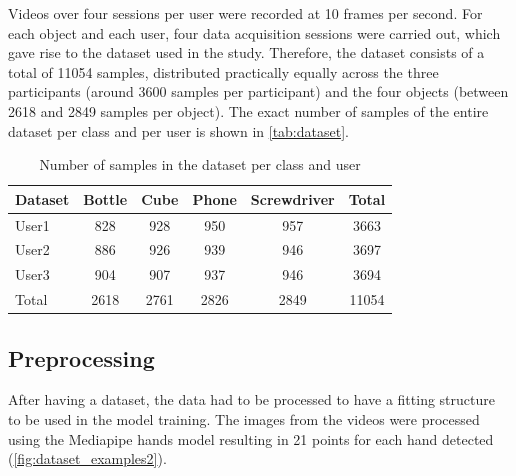 Videos over four sessions per user were recorded at 10 frames per second. For each object and each user, four data acquisition sessions were carried out, which gave rise to the dataset used in the study. Therefore, the dataset consists of a total of \num{11054} samples, distributed practically equally across the three participants (around \num{3600} samples per participant) and the four objects (between \num{2618} and \num{2849} samples per object). The exact number of samples of the entire dataset per class and per user is shown in \autoref{tab:dataset}.

\begin{table}[ht] 
\centering
\caption{Number of samples in the dataset per class and user}
\label{tab:dataset}
\begin{tabular}{lccccc}
\toprule
Dataset & Bottle & Cube & Phone & Screwdriver & Total \\
\midrule
User1 & \num{828} & \num{928} & \num{950} & \num{957} & \num{3663}\\
User2 & \num{886} & \num{926} & \num{939} & \num{946} & \num{3697}\\
User3 & \num{904} & \num{907} & \num{937} & \num{946} & \num{3694}\\
\midrule
Total & \num{2618} & \num{2761} & \num{2826} & \num{2849} & \num{11054}\\
\bottomrule
\end{tabular}
\end{table}

\subsection{Preprocessing}

After having a dataset, the data had to be processed to have a fitting structure to be used in the model training. The images from the videos were processed using the Mediapipe hands model resulting in 21 points for each hand detected (\autoref{fig:dataset_examples2}).

